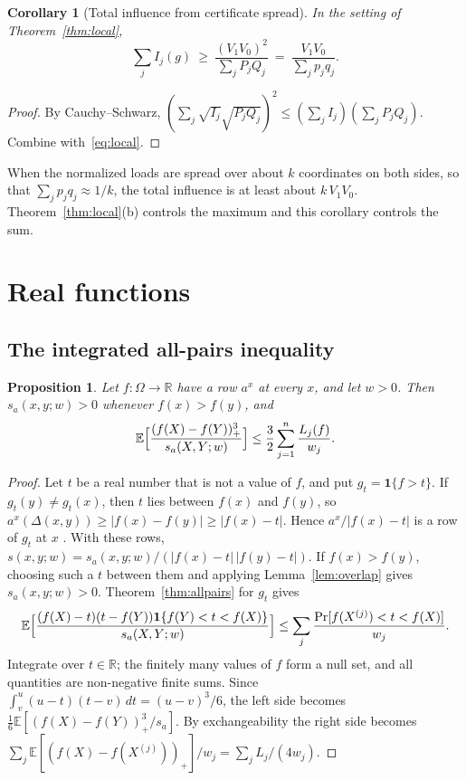 \documentclass[11pt]{article}
\numberwithin{equation}{section}
\newtheorem{proposition}[theorem]{Proposition}
\newtheorem{corollary}[theorem]{Corollary}
\theoremstyle{definition}
\theoremstyle{remark}
\newcommand{\E}{\mathbb{E}}
\newcommand{\R}{\mathbb{R}}
\newcommand{\1}{\mathbf 1}
\begin{document}
\begin{corollary}[Total influence from certificate spread]\label{cor:total}
In the setting of Theorem~\ref{thm:local},
\[
\sum_jI_j(g)\ \ge\ \frac{(V_1V_0)^2}{\sum_jP_jQ_j}\ =\ \frac{V_1V_0}{\sum_jp_jq_j}.
\]
\end{corollary}
\begin{proof}
By Cauchy--Schwarz, $(\sum_j\sqrt{I_j}\sqrt{P_jQ_j})^2\le(\sum_jI_j)(\sum_jP_jQ_j)$. Combine with~\eqref{eq:local}.
\end{proof}
When the normalized loads are spread over about $k$ coordinates on both sides, so that $\sum_jp_jq_j\approx1/k$, the total influence is at least about $k\,V_1V_0$. Theorem~\ref{thm:local}(b) controls the maximum and this corollary controls the sum.

\section{Real functions}

\subsection{The integrated all-pairs inequality}
\begin{proposition}\label{prop:integrated}
Let $f:\Omega\to\R$ have a row $a^x$ at every $x$, and let $w>0$. Then $s_a(x,y;w)>0$ whenever $f(x)>f(y)$, and
\begin{equation}\label{eq:integrated}
\E\Bigl[\frac{(f(X)-f(Y))_+^3}{s_a(X,Y;w)}\Bigr]\le\frac32\sum_{j=1}^n\frac{L_j(f)}{w_j}.
\end{equation}
\end{proposition}
\begin{proof}
Let $t$ be a real number that is not a value of $f$, and put $g_t=\1\{f>t\}$. If $g_t(y)\ne g_t(x)$, then $t$ lies between $f(x)$ and $f(y)$, so $a^x(\Delta(x,y))\ge|f(x)-f(y)|\ge|f(x)-t|$. Hence $a^x/|f(x)-t|$ is a row of $g_t$ at $x$ \cite[Lemma~2.4(iii)]{Tur26}. With these rows, $s(x,y;w)=s_a(x,y;w)/(|f(x)-t|\,|f(y)-t|)$. If $f(x)>f(y)$, choosing such a $t$ between them and applying Lemma~\ref{lem:overlap} gives $s_a(x,y;w)>0$. Theorem~\ref{thm:allpairs} for $g_t$ gives
\[
\E\Bigl[\frac{(f(X)-t)(t-f(Y))\1\{f(Y)<t<f(X)\}}{s_a(X,Y;w)}\Bigr]\le\sum_j\frac{\Pr[f(X^{(j)})<t<f(X)]}{w_j}.
\]
Integrate over $t\in\R$; the finitely many values of $f$ form a null set, and all quantities are non-negative finite sums. Since $\int_v^u(u-t)(t-v)\,dt=(u-v)^3/6$, the left side becomes $\frac16\E[(f(X)-f(Y))_+^3/s_a]$. By exchangeability the right side becomes $\sum_j\E[(f(X)-f(X^{(j)}))_+]/w_j=\sum_jL_j/(4w_j)$.
\end{proof}
\end{document}
